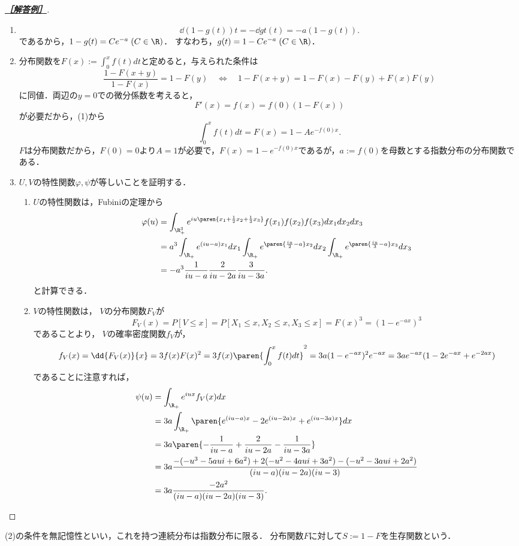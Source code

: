 \documentclass[uplatex,dvipdfmx]{jsarticle}
\begin{document}
\begin{proof}[\textbf{\underline{［解答例］}}]\mbox{}
    \begin{enumerate}
        \item \[\dd{(1-g(t))}{t}=-\dd{g}{t}(t)=-a(1-g(t)).\]
        であるから，$1-g(t)=Ce^{-a}\;(C\in\R)$．
        すなわち，$g(t)=1-Ce^{-a}\;(C\in\R)$．
        \item 分布関数を$F(x):=\int^x_0f(t)dt$と定めると，与えられた条件は
        \[\frac{1-F(x+y)}{1-F(x)}=1-F(y)\quad\Leftrightarrow\quad 1-F(x+y)=1-F(x)-F(y)+F(x)F(y)\]
        に同値．両辺の$y=0$での微分係数を考えると，
        \[F'(x)=f(x)=f(0)(1-F(x))\]
        が必要だから，(1)から
        \[\int^x_0f(t)dt=F(x)=1-Ae^{-f(0)x}.\]
        $F$は分布関数だから，$F(0)=0$より$A=1$が必要で，$F(x)=1-e^{-f(0)x}$であるが，$a:=f(0)$を母数とする指数分布の分布関数である．
        \item $U,V$の特性関数$\varphi,\psi$が等しいことを証明する．
        \begin{enumerate}
            \item $U$の特性関数は，Fubiniの定理から
            \begin{align*}
                \varphi(u)&=\int_{\R_+^3}e^{iu\paren{x_1+\frac{1}{2}x_2+\frac{1}{3}x_3}}f(x_1)f(x_2)f(x_3)dx_1dx_2dx_3\\
                &=a^3\int_{\R_+}e^{(iu-a)x_1}dx_1\int_{\R_+}e^{\paren{\frac{iu}{2}-a}x_2}dx_2\int_{\R_+}e^{\paren{\frac{iu}{3}-a}x_3}dx_3\\
                &=-a^3\frac{1}{iu-a}\frac{2}{iu-2a}\frac{3}{iu-3a}.
            \end{align*}
            と計算できる．
            \item $V$の特性関数は，
            $V$の分布関数$F_V$が
            \[F_V(x)=P[V\le x]=P[X_1\le x,X_2\le x,X_3\le x]=F(x)^3=(1-e^{-ax})^3\]
            であることより，
            $V$の確率密度関数$f_V$が，\[f_V(x)=\dd{F_V(x)}{x}=3f(x)F(x)^2=3f(x)\paren{\int_0^xf(t)dt}^2=3a(1-e^{-ax})^2e^{-ax}=3ae^{-ax}(1-2e^{-ax}+e^{-2ax})\]
            であることに注意すれば，
            \begin{align*}
                \psi(u)&=\int_{\R_+}e^{iux}f_V(x)dx\\
                &=3a\int_{\R_+}\paren{e^{(iu-a)x}-2e^{(iu-2a)x}+e^{(iu-3a)x}}dx\\
                &=3a\paren{-\frac{1}{iu-a}+\frac{2}{iu-2a}-\frac{1}{iu-3a}}\\
                &=3a\frac{-(-u^3-5aui+6a^2)+2(-u^2-4aui+3a^2)-(-u^2-3aui+2a^2)}{(iu-a)(iu-2a)(iu-3)}\\
                &=3a\frac{-2a^2}{(iu-a)(iu-2a)(iu-3)}.
            \end{align*}
        \end{enumerate}
    \end{enumerate}
\end{proof}
\begin{remarks*}[無記憶性による指数分布の特徴付け]
    (2)の条件を無記憶性といい，これを持つ連続分布は指数分布に限る．
    分布関数$F$に対して$S:=1-F$を生存関数という．
\end{remarks*}
\end{document}
